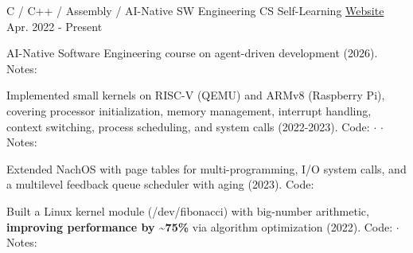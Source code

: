 

\begin{cventries}

  \cventry
    {C / C++ / Assembly / AI-Native SW Engineering} %
    {CS Self-Learning} %
    {\href{https://tingggggg.github.io/cs-self-learning/}{Website}} %
    {Apr. 2022 - Present} %
    {
      \begin{cvitems} %
        \item{AI-Native Software Engineering course on agent-driven development (2026). Notes: \href{https://github.com/tingggggg/NJU_AI-Native_Software_Engineering_2026}{}}
        \item{Implemented small kernels on RISC-V (QEMU) and ARMv8 (Raspberry Pi), covering processor initialization, memory management, interrupt handling, context switching, process scheduling, and system calls (2022-2023). Code: \href{https://github.com/tingggggg/riscv-operating-system/tree/main/os}{} $\cdot$ \href{https://github.com/tingggggg/OSDIg}{} $\cdot$ Notes: \href{https://hackmd.io/@timm/osdi}{}}
        \item{Extended NachOS with page tables for multi-programming, I/O system calls, and a multilevel feedback queue scheduler with aging (2023). Code: \href{https://github.com/tingggggg/NTHU_Nachos_Project}{}}
        \item{Built a Linux kernel module (/dev/fibonacci) with big-number arithmetic, \textbf{improving performance by \textasciitilde75\%} via algorithm optimization (2022). Code: \href{https://github.com/tingggggg/fibdrv}{} $\cdot$ Notes: \href{https://hackmd.io/@timm/fibdrv}{}}
      \end{cvitems}
    }

\end{cventries}
